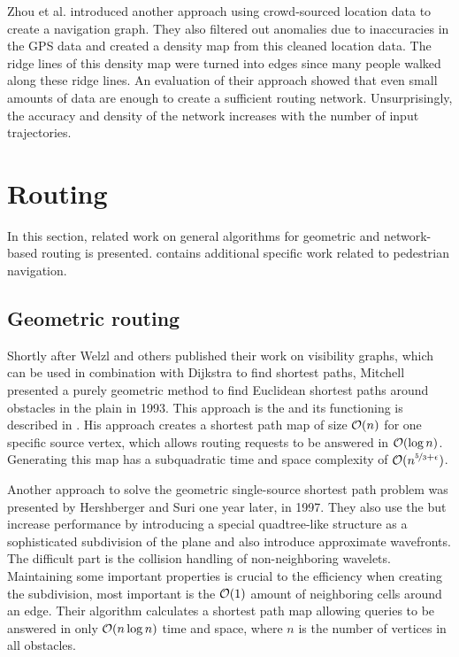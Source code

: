 		Zhou et al. introduced another approach using crowd-sourced location data to create a navigation graph\cite{zhou-crowd-sourced-navigation}.
		They also filtered out anomalies due to inaccuracies in the GPS data and created a density map from this cleaned location data.
		The ridge lines of this density map were turned into edges since many people walked along these ridge lines.
		An evaluation of their approach showed that even small amounts of data are enough to create a sufficient routing network.
		Unsurprisingly, the accuracy and density of the network increases with the number of input trajectories.
	
\section{Routing}

	In this section, related work on general algorithms for geometric and network-based routing is presented.
	 contains additional specific work related to pedestrian navigation.
	
	\subsection{Geometric routing}
	\label{subsec:related-work-geometric-routing}
	
		\label{related-work:mitchell}
		Shortly after Welzl and others published their work on visibility graphs, which can be used in combination with Dijkstra to find shortest paths, Mitchell presented a purely geometric method to find Euclidean shortest paths around obstacles in the plain in 1993\cite{mitchell-shortest-path}.
		This approach is the  and its functioning is described in .
		His approach creates a shortest path map of size $\mathcal{O}(n)$ for one specific source vertex, which allows routing requests to be answered in $\mathcal{O}(\log{n})$.
		Generating this map has a subquadratic time and space complexity of $\mathcal{O}(n^{\nicefrac{5}{3}+\epsilon})$.
		
		Another approach to solve the geometric single-source shortest path problem was presented by Hershberger and Suri one year later, in 1997\cite{hershberger-suri}.
		They also use the  but increase performance by introducing a special quadtree-like structure as a sophisticated subdivision of the plane and also introduce approximate wavefronts.
		The difficult part is the collision handling of non-neighboring wavelets.
		Maintaining some important properties is crucial to the efficiency when creating the subdivision, most important is the $\mathcal{O}(1)$ amount of neighboring cells around an edge.
		Their algorithm calculates a shortest path map allowing queries to be answered in only $\mathcal{O}(n \log n)$ time and space, where $n$ is the number of vertices in all obstacles.
		
